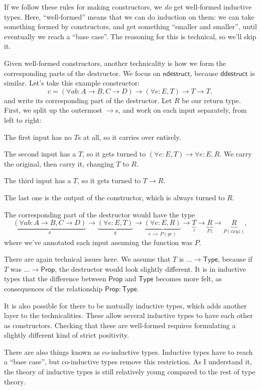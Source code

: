 \documentclass[11pt,paper=letter]{scrartcl}
\renewcommand{\sf}{\mathsf}
\newcommand{\prop}{\mathsf{Prop}}
\newcommand{\type}{\mathsf{Type}}
\newcommand{\smapsto}{\,\mapsto\,}
\begin{document}
If we follow these rules for making constructors, we \emph{do} get well-formed inductive types. Here, ``well-formed'' means that we can do induction on them: we can take something formed by constructors, and get something ``smaller and smaller'', until eventually we reach a ``base case''. The reasoning for this is technical, so we'll skip it.

Given well-formed constructors, another technicality is how we form the corresponding parts of the destructor. We focus on $\sf{ndestruct}$, because $\sf{ddestruct}$ is similar. Let's take this example constructor: \[
c = \left(\forall ab: A \to B, C \to D\right) \to (\forall e: E, T) \to T \to T,
\]
and write its corresponding part of the destructor. Let $R$ be our return type. First, we split up the outermost $\to$s, and work on each input separately, from left to right:
\begin{itemthin}
\item The first input has no $T$s at all, so it carries over entirely.
\item The second input has a $T$, so it gets turned to $(\forall e: E, T) \to \forall e: E, R$. We carry the original, then carry it, changing $T$ to $R$.
\item The third input has a $T$, so it gets turned to $T \to R$.
\item The last one is the output of the constructor, which is always turned to $R$.
\end{itemthin}
The corresponding part of the destructor would have the type \[
\underbrace{\left(\forall ab: A \to B, C \to D\right)}_{x} \to
\underbrace{(\forall e: E, T)}_{y} \to
\underbrace{(\forall e: E, R)}_{e\smapsto P(ye)} \to
\underbrace{T}_{z} \to
\underbrace{R}_{Pz} \to
\underbrace{R}_{P(cxyz)},
\]
where we've annotated each input assuming the function was $P$.

There are again technical issues here. We assume that $T$ is $\dots \to \type$, because if $T$ was $\dots \to \prop$, the destructor would look slightly different. It is in inductive types that the difference between $\prop$ and $\type$ becomes more felt, as consequences of the relationship $\prop : \type$.

It is also possible for there to be mutually inductive types, which adds another layer to the technicalities. These allow several inductive types to have each other as constructors. Checking that these are well-formed requires formulating a slightly different kind of strict positivity.

There are also things known as co-inductive types. Inductive types have to reach a ``base case'', but co-inductive types remove this restriction. As I understand it, the theory of inductive types is still relatively young compared to the rest of type theory.
\end{document}
